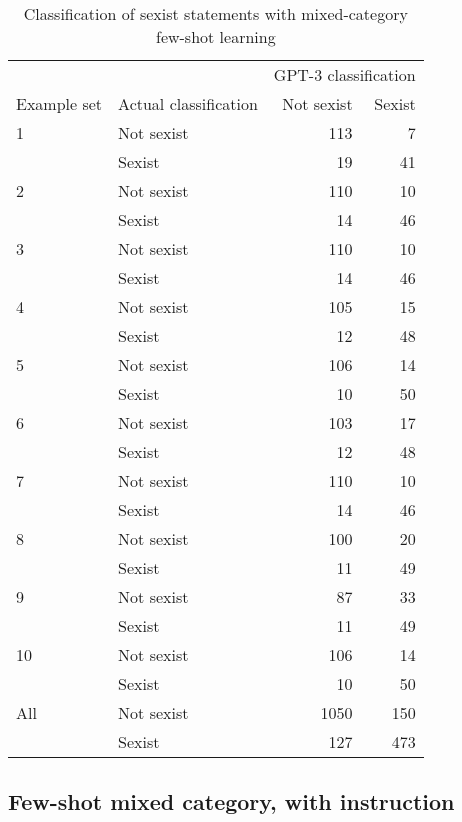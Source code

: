 \documentclass{bmcart}
\begin{document}
\begin{backmatter}
\begin{table}[!h]
\caption{\label{tab:fewshotmixed-sexism}Classification of sexist statements with mixed-category few-shot learning}
\centering
\fontsize{8}{10}\selectfont
\begin{tabular}[t]{llrr}
\hline
\multicolumn{2}{c}{ } & \multicolumn{2}{c}{GPT-3 classification} \\
Example set & Actual classification & Not sexist & Sexist\\
\hline
1 & Not sexist & 113 & 7\\
 & Sexist & 19 & 41\\
\hline
2 & Not sexist & 110 & 10\\
 & Sexist & 14 & 46\\
\hline
3 & Not sexist & 110 & 10\\
 & Sexist & 14 & 46\\
\hline
4 & Not sexist & 105 & 15\\
 & Sexist & 12 & 48\\
\hline
5 & Not sexist & 106 & 14\\
 & Sexist & 10 & 50\\
\hline
6 & Not sexist & 103 & 17\\
 & Sexist & 12 & 48\\
\hline
7 & Not sexist & 110 & 10\\
 & Sexist & 14 & 46\\
\hline
8 & Not sexist & 100 & 20\\
 & Sexist & 11 & 49\\
\hline
9 & Not sexist & 87 & 33\\
 & Sexist & 11 & 49\\
\hline
10 & Not sexist & 106 & 14\\
 & Sexist & 10 & 50\\
\hline
All & Not sexist & 1050 & 150\\
 & Sexist & 127 & 473\\
\hline
\end{tabular}
\end{table}

\newpage


\subsection{Few-shot mixed category, with instruction}\label{appendxbmuxedubstryctub}

\begin{table}[!h]


\end{table}
\end{backmatter}
\end{document}
